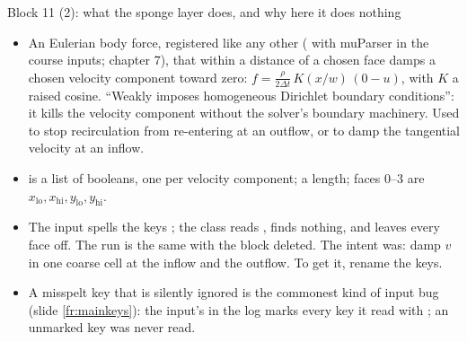 \documentclass[aspectratio=169,11pt]{beamer}
\begin{document}
\begin{frame}{Block 11 (2): what the sponge layer does, and why here it does nothing}
\label{fr:sponge2}
\footnotesize
\begin{itemize}
  \item {} An Eulerian body force, registered like any other ( with muParser in the course inputs; chapter 7), that within a distance  of a chosen face damps a chosen velocity component toward zero: $f = \tfrac{\rho}{2\Delta t}\,K(x/w)\,(0 - u)$, with $K$ a raised cosine. ``Weakly imposes homogeneous Dirichlet boundary conditions'': it kills the velocity component without the solver's boundary machinery. Used to stop recirculation from re-entering at an outflow, or to damp the tangential velocity at an inflow.
  \item {}  is a list of  booleans, one per velocity component;  a length; faces $0$--$3$ are $x_{\mathrm{lo}}, x_{\mathrm{hi}}, y_{\mathrm{lo}}, y_{\mathrm{hi}}$.
  \item {} The input spells the keys ; the class reads , finds nothing, and leaves every face off. The run is the same with the block deleted. The intent was: damp $v$ in one coarse cell at the inflow and the outflow. To get it, rename the keys.
  \item A misspelt key that is silently ignored is the commonest kind of input bug (slide \ref{fr:mainkeys}): the input's  in the log marks every key it read with ; an unmarked key was never read.
\end{itemize}
\end{frame}
\end{document}

